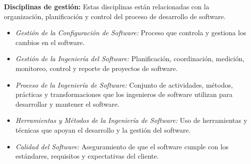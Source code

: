 \textbf{Disciplinas de gestión: }Estas disciplinas están relacionadas con la organización, planificación y control del proceso de desarrollo de software.
\begin{itemize}
    \item \textit{Gestión de la Configuración de Software: }Proceso que controla y gestiona los cambios en el software.
    \item \textit{Gestión de la Ingeniería del Software: }Planificación, coordinación, medición, monitoreo, control y reporte de proyectos de software.
    \item \textit{Proceso de la Ingeniería de Software: }Conjunto de actividades, métodos, prácticas y transformaciones que los ingenieros de software utilizan para desarrollar y mantener el software.
    \item \textit{Herramientas y Métodos de la Ingeniería de Software: }Uso de herramientas y técnicas que apoyan el desarrollo y la gestión del software.
    \item \textit{Calidad del Software: }Aseguramiento de que el software cumple con los estándares, requisitos y expectativas del cliente.
\end{itemize}



